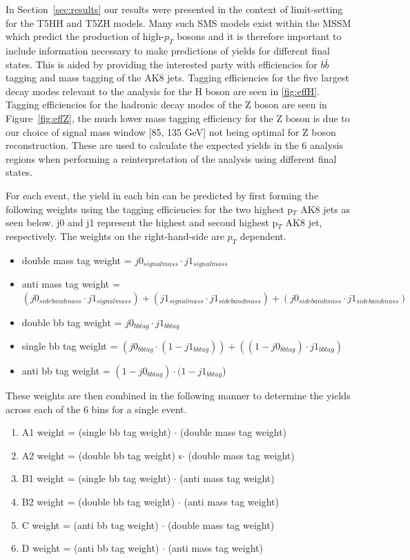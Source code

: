 In Section~\ref{sec:results} our results were presented in the context of limit-setting for the T5HH and T5ZH models. Many such SMS models exist within the MSSM which predict the production of high-$p_{T}$ bosons and it is therefore important to include information necessary to make predictions of yields for different final states. This is aided by providing the interested party with efficiencies for $b\bar{b}$ tagging and mass tagging of the AK8 jets. Tagging efficiencies for the five largest decay modes relevant to the analysis for the H boson are seen in \ref{fig:effH}. Tagging efficiencies for the hadronic decay modes of the Z boson are seen in Figure~\ref{fig:effZ}, the much lower mass tagging efficiency for the Z boson is due to our choice of signal mass window [85, 135 GeV] not being optimal for Z boson reconstruction. These are used to calculate the expected yields in the 6 analysis regions when performing a reinterpretation of the analysis using different final states. 

For each event, the yield in each bin can be predicted by first forming the following weights using the tagging efficiencies for the two highest p$_{T}$ AK8 jets as seen below. j0 and j1 represent the highest and second highest p$_{T}$ AK8 jet, respectively. The weights on the right-hand-side are $p_{T}$ dependent.

\begin{itemize}
\item double mass tag weight = $j0_{signalmass} \cdot j1_{signalmass}$
\item anti mass tag weight = $(j0_{sidebandmass} \cdot j1_{signalmass}) + (j1_{signalmass} \cdot j1_{sidebandmass}) + (j0_{sidebandmass} \cdot j1_{sidebandmass})$
\item double bb tag weight = $j0_{bbtag} \cdot j1_{bbtag}$
\item single bb tag weight = $(j0_{bbtag} \cdot (1-j1_{bbtag})) + ((1-j0_{bbtag})\cdot j1_{bbtag})$
\item anti bb tag weight = $(1-j0_{bbtag}) \cdot (1-j1_{bbtag}$)
\end{itemize}

These weights are then combined in the following manner to determine the yields across each of the 6 bins for a single event.

\begin{enumerate}
\item A1 weight = (single bb tag weight) $\cdot$ (double mass tag weight)
\item A2 weight = (double bb tag weight) s$\cdot$ (double mass tag weight)
\item B1 weight = (single bb tag weight) $\cdot$ (anti mass tag weight)
\item B2 weight = (double bb tag weight) $\cdot$ (anti mass tag weight)
\item C weight = (anti bb tag weight) $\cdot$ (double mass tag weight)
\item D weight = (anti bb tag weight) $\cdot$ (anti mass tag weight)
\end{enumerate}


